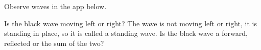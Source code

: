 \documentclass{ximera}
\begin{document}
\begin{question}

Observe waves in the app below. 


\begin{center}  
\end{center} 


Is the black wave moving left or right? The wave is not moving left or right, it is standing in place, so it is called a standing wave. Is the black wave a forward, reflected or the sum of the two?
\begin{multipleChoice}  
\end{multipleChoice}  

\end{question}
\end{document}

